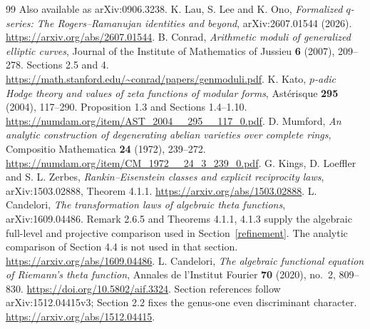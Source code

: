 \documentclass[11pt]{article}
\theoremstyle{remark}\newtheorem{remark}[theorem]{Remark}
\begin{document}
\begin{thebibliography}{99}
Also available as arXiv:0906.3238.
 K. Lau, S. Lee and K. Ono, \emph{Formalized
$q$-series: The Rogers--Ramanujan identities and beyond},
arXiv:2607.01544 (2026). \url{https://arxiv.org/abs/2607.01544}.
 B. Conrad, \emph{Arithmetic moduli of generalized elliptic
curves}, Journal of the Institute of Mathematics of Jussieu
\textbf{6} (2007), 209--278. Sections 2.5 and 4.
\url{https://math.stanford.edu/~conrad/papers/genmoduli.pdf}.
 K. Kato, \emph{$p$-adic Hodge theory and values of zeta
functions of modular forms}, Ast\'erisque \textbf{295} (2004), 117--290.
Proposition 1.3 and Sections 1.4--1.10.
\url{https://numdam.org/item/AST_2004__295__117_0.pdf}.
 D. Mumford, \emph{An analytic construction of degenerating
abelian varieties over complete rings}, Compositio Mathematica
\textbf{24} (1972), 239--272.
\url{https://numdam.org/item/CM_1972__24_3_239_0.pdf}.
 G. Kings, D. Loeffler and S. L. Zerbes,
\emph{Rankin--Eisenstein classes and explicit reciprocity laws},
arXiv:1503.02888, Theorem 4.1.1.
\url{https://arxiv.org/abs/1503.02888}.
 L. Candelori, \emph{The transformation laws of algebraic
theta functions}, arXiv:1609.04486.
Remark 2.6.5 and Theorems 4.1.1, 4.1.3 supply the algebraic
full-level and projective comparison used in Section~\ref{refinement}.
The analytic comparison of Section 4.4 is not used in that section.
\url{https://arxiv.org/abs/1609.04486}.
 L. Candelori, \emph{The algebraic functional
 equation of Riemann's theta function}, Annales de l'Institut Fourier
\textbf{70} (2020), no.~2, 809--830.
\url{https://doi.org/10.5802/aif.3324}.
Section references follow arXiv:1512.04415v3; Section 2.2 fixes the
genus-one even discriminant character.
\url{https://arxiv.org/abs/1512.04415}.
\end{thebibliography}
\end{document}
